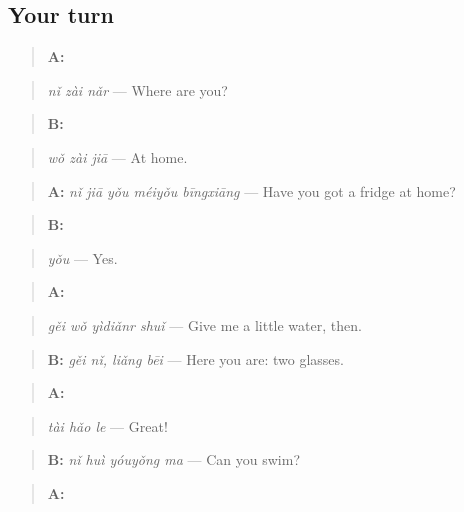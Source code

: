 \subsection*{Your turn}
\begin{quote}
\textbf{A:} 
\end{quote}

\begin{quote}
\emph{nǐ zài nǎr} — Where are you?
\end{quote}

\begin{quote}
\textbf{B:} 
\end{quote}

\begin{quote}
\emph{wǒ zài jiā} — At home.
\end{quote}

\begin{quote}
\textbf{A:} \emph{nǐ jiā yǒu méiyǒu bīngxiāng} — Have you got a fridge at home?
\end{quote}

\begin{quote}
\textbf{B:} 
\end{quote}

\begin{quote}
\emph{yǒu} — Yes.
\end{quote}

\begin{quote}
\textbf{A:} 
\end{quote}

\begin{quote}
\emph{gěi wǒ yìdiǎnr shuǐ} — Give me a little water, then.
\end{quote}

\begin{quote}
\textbf{B:} \emph{gěi nǐ, liǎng bēi} — Here you are: two glasses.
\end{quote}

\begin{quote}
\textbf{A:} 
\end{quote}

\begin{quote}
\emph{tài hǎo le} — Great!
\end{quote}

\begin{quote}
\textbf{B:} \emph{nǐ huì yóuyǒng ma} — Can you swim?
\end{quote}

\begin{quote}
\textbf{A:}  
\end{quote}

